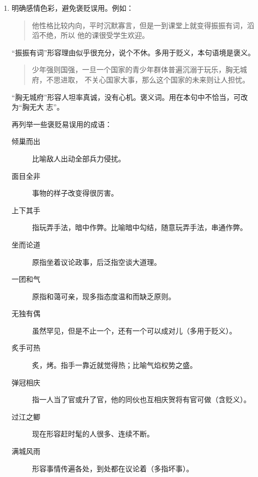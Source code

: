 \documentclass[final,oneside]{ctexbook}
\newenvironment{equotation}{\begin{quotation}\kaishu}{\end{quotation}}
\begin{document}
\begin{enumerate}
\begin{description}
    \end{description}

  \item 明确感情色彩，避免褒贬误用。例如：
    \begin{equotation}
      他性格比较内向，平时沉默寡言，但是一到课堂上就变得振振有词，滔滔不绝，所以
      他的课很受学生欢迎。
    \end{equotation}
    “振振有词”形容理由似乎很充分，说个不休。多用于贬义，本句语境是褒义。
    \begin{equotation}
      少年强则国强，一旦一个国家的青少年群体普遍沉溺于玩乐，胸无城府，不思进取，
      不关心国家大事，那么这个国家的未来则让人担忧。
    \end{equotation}
    “胸无城府”形容人坦率真诚，没有心机。褒义词。用在本句中不恰当，可改为“胸无大
    志”。

    再列举一些褒贬易误用的成语：

    \begin{description}

      \item[倾巢而出] 比喻敌人出动全部兵力侵扰。

      \item[面目全非] 事物的样子改变得很厉害。

      \item[上下其手] 指玩弄手法，暗中作弊。比喻暗中勾结，随意玩弄手法，串通作弊。

      \item[坐而论道] 原指坐着议论政事，后泛指空谈大道理。

      \item[一团和气] 原指和蔼可亲，现多指态度温和而缺乏原则。

      \item[无独有偶] 虽然罕见，但是不止一个，还有一个可以成对儿（多用于贬义）。

      \item[炙手可热] 炙，烤。指手一靠近就觉得热；比喻气焰权势之盛。

      \item[弹冠相庆] 指一人当了官或升了官，他的同伙也互相庆贺将有官可做（含贬义）。

      \item[过江之鲫] 现在形容赶时髦的人很多、连续不断。

      \item[满城风雨] 形容事情传遍各处，到处都在议论着（多指坏事）。

    \end{description}


\end{enumerate}
\end{document}
